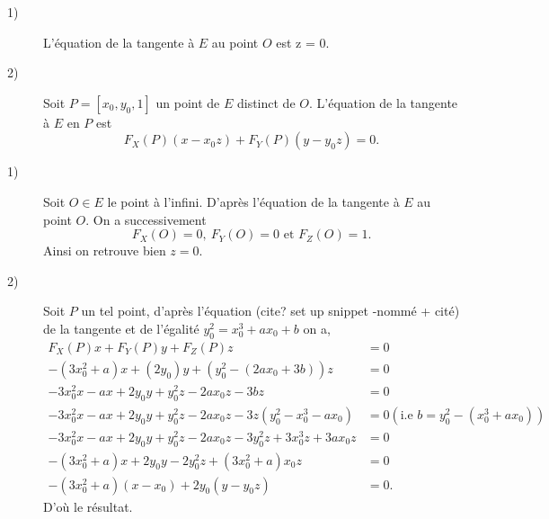 
\begin{lemme}
    \begin{description}
        \item[1)] L'équation de la tangente à $E$ au point $O$ est z = 0.
        \item[2)] Soit $P = \left[ x_0, y_0, 1 \right]$ un point de $E$ distinct de $O$. L'équation de la tangente à $E$ en $P$ est
            \[
            F_{X}(P)\left( x - x_0z \right) + F_{Y}(P)\left( y - y_0z \right) = 0
            .\] 
    \end{description}
\end{lemme}

\begin{demonstration}
    \begin{description}
        \item[1)] Soit  $O \in E$ le point à l'infini. D'après l'équation de la tangente à $E$ au point $O$. On a successivement 
            \[
            F_{X}(O) = 0, \ F_{Y}(O) = 0 \text{ et } F_{Z}(O) = 1
            .\] 
            Ainsi on retrouve bien $z = 0$.

        \item[2)] Soit $P$ un tel point, d'après l'équation (cite? set up snippet -nommé + cité) de la tangente et de l'égalité $y_0^2 = x_0^3 + ax_0 + b$ on a,
            \begin{align*}
                F_{X}(P)x + F_{Y}(P)y + F_{Z}(P)z &= 0 \\
                - \left( 3x_0^2 + a \right)x + \left( 2y_0 \right)y + \left( y_0^2 - \left( 2ax_0 + 3b \right) \right)z &= 0 \\
                - 3x_0^2x - ax + 2y_0y + y_0^2z - 2ax_0z - 3bz &= 0 \\ 
                - 3x_0^2x - ax + 2y_0y + y_0^2z - 2ax_0z - 3z\left( y_0^2 - x_0^3 - ax_0 \right) &= 0 \left( \text{i.e } b = y_0^2 - \left( x_0^3 + ax_0 \right) \right) \\
                - 3x_0^2x -ax + 2y_0y + y_0^2z - 2ax_0z - 3y_0^2z + 3x_0^3z + 3ax_0z &= 0 \\
                - \left( 3x_0^2 + a \right)x + 2y_0y - 2y_0^2z + \left( 3x_0^2 + a \right)x_0z &= 0\\
                - \left( 3x_0^2 + a \right)\left( x - x_0 \right) + 2y_0\left( y - y_0z \right) &= 0
            .\end{align*}
            D'où le résultat.
    \end{description}
    
\end{demonstration}
